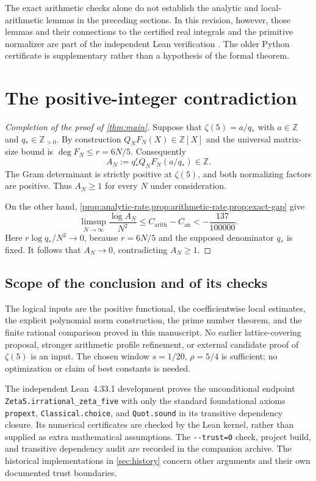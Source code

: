 \documentclass[11pt,letterpaper]{article}
\theoremstyle{definition}
\newcommand{\Z}{\mathbb Z}
\newcommand{\arith}{\mathrm{arith}}
\newcommand{\an}{\mathrm{an}}
\begin{document}
The exact arithmetic checks alone do not establish the analytic and
local-arithmetic lemmas in the preceding sections. In this revision,
however, those lemmas and their connections to the certified real
integrals and the primitive normalizer are part of the independent
Lean verification \cite{zeta5lean2026}. The older Python certificate
is supplementary rather than a hypothesis of the formal theorem.


\section{The positive-integer contradiction}\label{sec:contradiction}

\begin{proof}[Completion of the proof of \cref{thm:main}]
Suppose that $\zeta(5)=a/q_*$ with $a\in\Z$ and $q_*\in\Z_{>0}$.
By construction $Q_NF_N(X)\in\Z[X]$ and the universal
matrix-size bound is $\deg F_N\le r=6N/5$.
Consequently
\[
 A_N:=q_*^r Q_NF_N(a/q_*)\in\Z.
\]
The Gram determinant is strictly positive at $\zeta(5)$, and both
normalizing factors are positive. Thus $A_N\ge1$ for every $N$ under
consideration.

On the other hand, \cref{prop:analytic-rate,prop:arithmetic-rate,prop:exact-gap}
give
\[
 \limsup_{N\to\infty}\frac{\log A_N}{N^2}
 \le C_{\arith}-C_{\an}<-\frac{137}{100000}.
\]
Here $r\log q_*/N^2\to0$, because $r=6N/5$ and the
supposed denominator $q_*$ is fixed.
It follows that $A_N\to0$, contradicting $A_N\ge1$.
\end{proof}

\subsection{Scope of the conclusion and of its checks}
The logical inputs are the positive functional, the coefficientwise
local estimates, the explicit polynomial norm construction, the prime
number theorem, and the finite rational comparison proved in this
manuscript. No earlier lattice-covering proposal, stronger arithmetic
profile refinement, or external candidate proof of $\zeta(5)$ is an input.
The chosen window $s=1/20$, $\rho=5/4$ is sufficient; no optimization or
claim of best constants is needed.

The independent Lean~4.33.1 development \cite{zeta5lean2026}
proves the unconditional endpoint
\texttt{Zeta5.\allowbreak irrational\_\allowbreak zeta\_\allowbreak five} with only the standard
foundational axioms \texttt{propext}, \texttt{Classical.choice}, and
\texttt{Quot.sound} in its transitive dependency closure. Its numerical
certificates are checked by the Lean kernel, rather than supplied as
extra mathematical assumptions. The \verb|--trust=0| check, project
build, and transitive dependency audit are recorded in the companion
archive.
The historical implementations in \cref{sec:history} concern other
arguments and their own documented trust boundaries.
\end{document}
